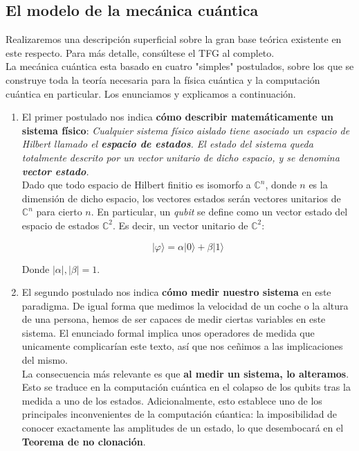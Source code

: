 \documentclass[11pt]{article}
\newcommand*{\C}{\mathbb{C}}
\newcommand*{\ra}{\rangle}
\begin{document}
\subsection{El modelo de la mecánica cuántica}

Realizaremos una descripción superficial sobre la gran base teórica existente en este respecto. Para más detalle, consúltese el TFG al completo. \\

La mecánica cuántica esta basado en cuatro "simples" postulados, sobre los que se construye toda la teoría necesaria para la física cuántica y la computación cuántica en particular. Los enunciamos y explicamos a continuación.

\begin{enumerate}
	\item El primer postulado nos indica \textbf{cómo describir matemáticamente un sistema físico}: \emph{Cualquier sistema físico aislado tiene asociado un espacio de Hilbert llamado el \textbf{espacio de estados}. El estado del sistema queda totalmente descrito por un vector unitario de dicho espacio, y se denomina \textbf{vector estado}.} \\
	
	Dado que todo espacio de Hilbert finitio es isomorfo a $\mathbb C^n$, donde $n$ es la dimensión de dicho espacio, los vectores estados serán vectores unitarios de $\C^n$ para cierto $n$. En particular, un \emph{qubit} se define como un vector estado del espacio de estados $\C^2$. Es decir, un vector unitario de $\C^2$:
	
	\[ |\varphi\ra = \alpha|0\ra + \beta|1\ra \]
	
	Donde $|\alpha|, |\beta| = 1$.
	
	\item El segundo postulado nos indica \textbf{cómo medir nuestro sistema} en este paradigma. De igual forma que medimos la velocidad de un coche o la altura de una persona, hemos de ser capaces de medir ciertas variables en este sistema. El enunciado formal implica unos operadores de medida que unicamente complicarían este texto, así que nos ceñimos a las implicaciones del mismo. \\
	
	La consecuencia más relevante es que \textbf{al medir un sistema, lo alteramos}. Esto se traduce en la computación cuántica en el colapso de los qubits tras la medida a uno de los estados. Adicionalmente, esto establece uno de los principales inconvenientes de la computación cúantica: la imposibilidad de conocer exactamente las amplitudes de un estado, lo que desembocará en el \textbf{Teorema de no clonación}.
	

\end{enumerate}
\end{document}
